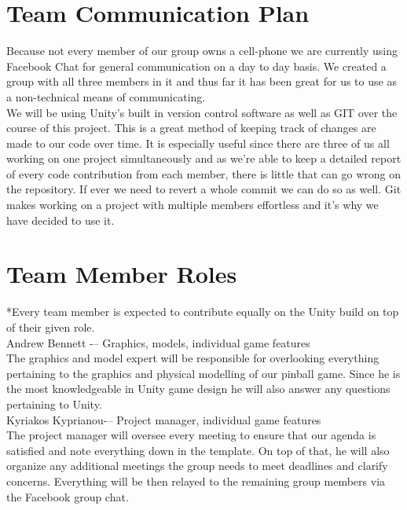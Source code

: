 \documentclass{article}
\begin{document}
\section{Team Communication Plan}


Because not every member of our group owns a cell-phone we are currently using Facebook Chat for general communication on a day to day basis. We created a group with all three members in it and thus far it has been great for us to use as a non-technical means of communicating.\\

\noindent We will be using Unity's built in version control software as well as GIT over the course of this project. This is a great method of keeping track of changes are made to our code over time. It is especially useful since there are three of us all working on one project simultaneously and as we're able to keep a detailed report of every code contribution from each member, there is little that can go wrong on the repository. If ever we need to revert a whole commit we can do so as well. Git makes working on a project with multiple members effortless and it’s why we have decided to use it. 


\section{Team Member Roles}

*Every team member is expected to contribute equally on the Unity build on top of their given role.\\

Andrew Bennett -– Graphics, models, individual game features\\

The graphics and model expert will be responsible for overlooking everything pertaining to the graphics and physical modelling of our pinball game. Since he is the most knowledgeable in Unity game design he will also answer any questions pertaining to Unity.\\

Kyriakos Kyprianou-– Project manager, individual game features\\

The project manager will oversee every meeting to ensure that our agenda is satisfied and note everything down in the template. On top of that, he will also organize any additional meetings the group needs to meet deadlines and clarify concerns. Everything will be then relayed to the remaining group members via the Facebook group chat.\\
\end{document}
